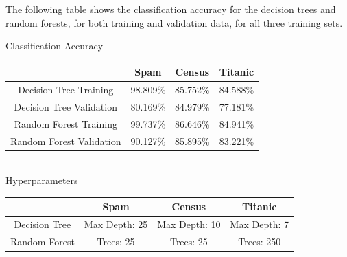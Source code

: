 \documentclass{article}
\begin{document}
The following table shows the classification accuracy for the decision trees and random forests, for both training and validation data, for all three training sets.
\vspace{.25in}
\begin{center}
Classification Accuracy\\
\begin{tabular}{|c|c|c|c|}
\hline
 & Spam & Census & Titanic \\
\hline
Decision Tree Training & 98.809\% & 85.752\% & 84.588\% \\
Decision Tree Validation & 80.169\% & 84.979\% & 77.181\% \\
\hline
Random Forest Training & 99.737\% & 86.646\% & 84.941\%	 \\
Random Forest Validation & 90.127\% & 85.895\% & 83.221\% \\
\hline
\end{tabular}\\
\vspace{.5in}
Hyperparameters\\
\begin{tabular}{|c|c|c|c|}
\hline
 & Spam & Census & Titanic \\
\hline
Decision Tree & Max Depth: 25 & Max Depth: 10 & Max Depth: 7 \\
\hline
Random Forest & Trees: 25 & Trees: 25 & Trees: 250 \\
\hline
\end{tabular}
\end{center}

\newpage
\end{document}
